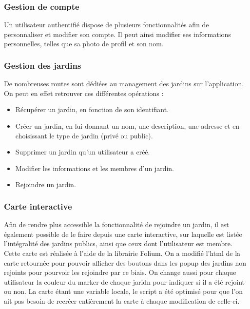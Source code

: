 \documentclass[french,a4paper]{article}
\begin{document}
\subsubsection{Gestion de compte}
Un utilisateur authentifié dispose de plusieurs fonctionnalités afin de personnaliser et modifier son compte. Il peut ainsi modifier ses informations personnelles, telles que sa photo de profil et son nom.
\subsubsection{Gestion des jardins}
De nombreuses routes sont dédiées au management des jardins sur l'application. On peut en effet retrouver ces différentes opérations :
\begin{itemize}
    \item Récupérer un jardin, en fonction de son identifiant.
    \item Créer un jardin, en lui donnant un nom, une description, une adresse et en choisissant le type de jardin (privé ou public).
    \item Supprimer un jardin qu'un utilisateur a créé.
    \item Modifier les informations et les membres d'un jardin.
    \item Rejoindre un jardin.
\end{itemize}
\subsubsection{Carte interactive}
Afin de rendre plus accessible la fonctionnalité de rejoindre un jardin, il est également possible de le faire depuis une carte interactive, sur laquelle est listée l'intégralité des jardins publics, ainsi que ceux dont l'utilisateur est membre. Cette carte est réalisée à l'aide de la librairie Folium. On a modifié l'html de la carte retournée pour pouvoir afficher des boutons dans les popup des jardins non rejoints pour pourvoir les rejoindre par ce biais. On change aussi pour chaque utilisateur la couleur du marker de chaque jaridn pour indiquer si il a été rejoint ou non.
La carte étant une variable locale, le script a été optimisé pour que l'on ait pas besoin de recréer entièrement la carte à chaque modification de celle-ci.
\end{document}
